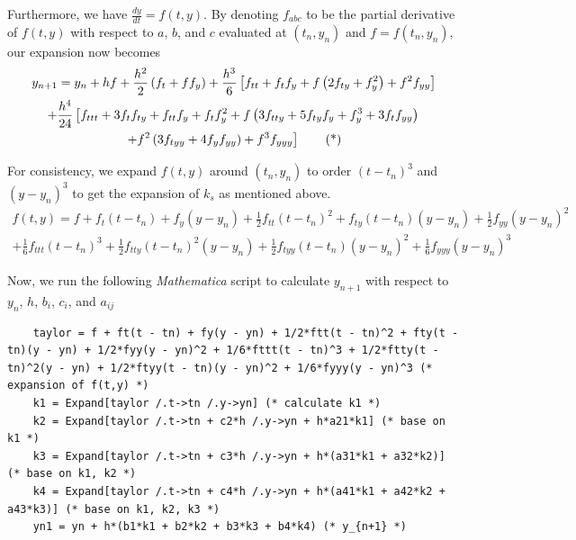\documentclass[a4paper]{article}
\begin{document}
Furthermore, we have \(\frac{dy}{dt} = f(t,y)\). By denoting \(f_{abc}\) to be the partial derivative of \(f(t,y)\) with respect to \(a\), \(b\), and \(c\) evaluated at \((t_n, y_n)\) and \(f = f(t_n, y_n)\), our expansion now becomes
\begin{multline*}
  y_{n+1} = y_n + hf + \frac{h^2}{2}\left(f_t + f f_y\right) + \frac{h^3}{6}\left[f_{tt} + f_t f_y + f\left(2f_{ty} + f_y^2\right) + f^2 f_{yy}\right] \\
  + \frac{h^4}{24}\left[f_{ttt} + 3f_t f_{ty} + f_{tt} f_y + f_t f_y^2 + f\left(3f_{tty} + 5f_{ty} f_y + f_y^3 + 3f_t f_{yy}\right)\right.     \\
    \left.+ f^2\left(3f_{tyy} + 4f_y f_{yy}\right) + f^3 f_{yyy}\vphantom{f_y^3}\right] \tag{*}
\end{multline*}

For consistency, we expand \(f(t,y)\) around \((t_n, y_n)\) to order \({(t-t_n)}^3\) and \({(y-y_n)}^3\) to get the expansion of \(k_s\) as mentioned above.
\begin{multline*}
  f(t,y) = f + f_t(t-t_n) + f_y(y-y_n) + \frac{1}{2}f_{tt}{(t-t_n)}^2 + f_{ty}(t-t_n)(y-y_n) + \frac{1}{2}f_{yy}{(y-y_n)}^2                        \\
  + \frac{1}{6}f_{ttt}{(t-t_n)}^3 + \frac{1}{2}f_{tty}{(t-t_n)}^2(y-y_n) + \frac{1}{2}f_{tyy}(t-t_n){(y-y_n)}^2 + \frac{1}{6}f_{yyy}{(y-y_n)}^3
\end{multline*}

Now, we run the following \textit{Mathematica} script to calculate \(y_{n+1}\) with respect to \(y_n\), \(h\), \(b_i\), \(c_i\), and \(a_{ij}\)
\begin{mdframed}[leftline=false,rightline=false,backgroundcolor=magenta!10]
  \begin{verbatim}
    taylor = f + ft(t - tn) + fy(y - yn) + 1/2*ftt(t - tn)^2 + fty(t - tn)(y - yn) + 1/2*fyy(y - yn)^2 + 1/6*fttt(t - tn)^3 + 1/2*ftty(t - tn)^2(y - yn) + 1/2*ftyy(t - tn)(y - yn)^2 + 1/6*fyyy(y - yn)^3 (* expansion of f(t,y) *)
    k1 = Expand[taylor /.t->tn /.y->yn] (* calculate k1 *)
    k2 = Expand[taylor /.t->tn + c2*h /.y->yn + h*a21*k1] (* base on k1 *)
    k3 = Expand[taylor /.t->tn + c3*h /.y->yn + h*(a31*k1 + a32*k2)] (* base on k1, k2 *)
    k4 = Expand[taylor /.t->tn + c4*h /.y->yn + h*(a41*k1 + a42*k2 + a43*k3)] (* base on k1, k2, k3 *)
    yn1 = yn + h*(b1*k1 + b2*k2 + b3*k3 + b4*k4) (* y_{n+1} *)
  \end{verbatim}
\end{mdframed}
\end{document}
